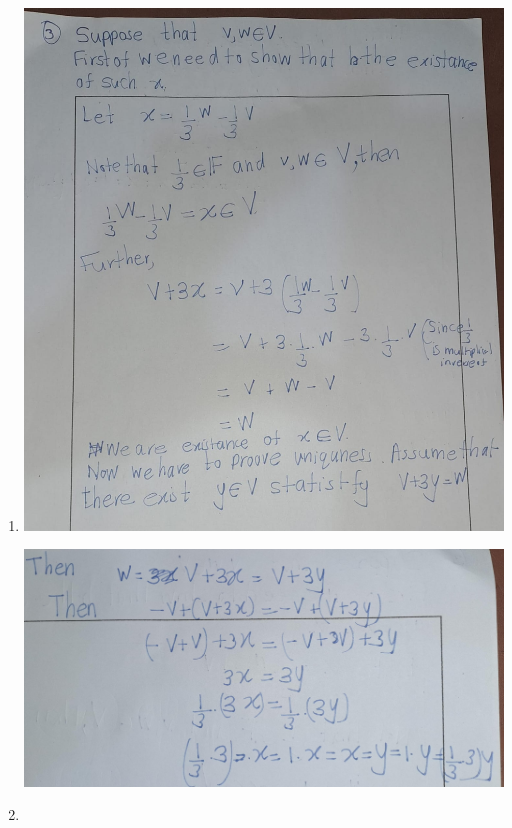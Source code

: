 \documentclass[
]{book}
\theoremstyle{definition}
\theoremstyle{definition}
\theoremstyle{definition}
\theoremstyle{definition}
\theoremstyle{remark}
\begin{document}
\begin{enumerate}
\def\labelenumi{\arabic{enumi}.}
\setcounter{enumi}{2}
\item
  \includegraphics{fig/Ex1B/Ex3-1.jpg}

  \includegraphics{fig/Ex1B/Ex3-2.jpg}
\item
\end{enumerate}
\end{document}
